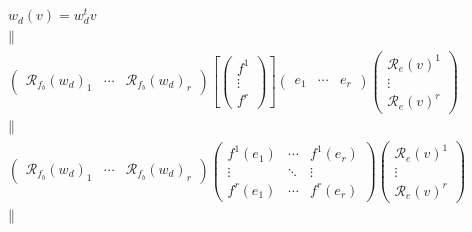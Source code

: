\documentclass[aps,preprint]{revtex4}
\begin{document}
\begin{gather}
w_{d}\left( v\right) =w_{d}^{t}v \\
\parallel \\
\left( 
\begin{array}{ccc}
\mathcal{R}_{f_{b}}\left( w_{d}\right) _{1} & \cdots & \mathcal{R}%
_{f_{b}}\left( w_{d}\right) _{r}%
\end{array}%
\right) \left[ \left( 
\begin{array}{c}
f^{1} \\ 
\vdots \\ 
f^{r}%
\end{array}%
\right) \right] \left( 
\begin{array}{ccc}
e_{1} & \cdots & e_{r}%
\end{array}%
\right) \left( 
\begin{array}{c}
\mathcal{R}_{e}\left( v\right) ^{1} \\ 
\vdots \\ 
\mathcal{R}_{e}\left( v\right) ^{r}%
\end{array}%
\right) \\
\parallel \\
\left( 
\begin{array}{ccc}
\mathcal{R}_{f_{b}}\left( w_{d}\right) _{1} & \cdots & \mathcal{R}%
_{f_{b}}\left( w_{d}\right) _{r}%
\end{array}%
\right) \left( 
\begin{array}{ccc}
f^{1}\left( e_{1}\right) & \cdots & f^{1}\left( e_{r}\right) \\ 
\vdots & \ddots & \vdots \\ 
f^{r}\left( e_{1}\right) & \cdots & f^{r}\left( e_{r}\right)%
\end{array}%
\right) \left( 
\begin{array}{c}
\mathcal{R}_{e}\left( v\right) ^{1} \\ 
\vdots \\ 
\mathcal{R}_{e}\left( v\right) ^{r}%
\end{array}%
\right) \\
\parallel
\end{gather}%
\end{document}
